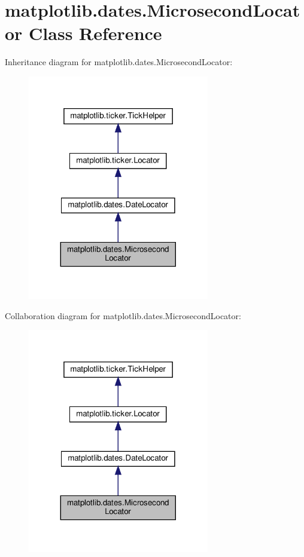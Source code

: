 \hypertarget{classmatplotlib_1_1dates_1_1MicrosecondLocator}{}\section{matplotlib.\+dates.\+Microsecond\+Locator Class Reference}
\label{classmatplotlib_1_1dates_1_1MicrosecondLocator}


Inheritance diagram for matplotlib.\+dates.\+Microsecond\+Locator\+:
\nopagebreak
\begin{figure}[H]
\begin{center}
\leavevmode
\includegraphics[width=224pt]{classmatplotlib_1_1dates_1_1MicrosecondLocator__inherit__graph}
\end{center}
\end{figure}


Collaboration diagram for matplotlib.\+dates.\+Microsecond\+Locator\+:
\nopagebreak
\begin{figure}[H]
\begin{center}
\leavevmode
\includegraphics[width=224pt]{classmatplotlib_1_1dates_1_1MicrosecondLocator__coll__graph}
\end{center}
\end{figure}
